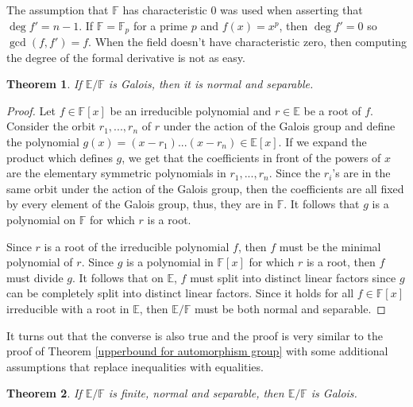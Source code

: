 \documentclass{article}
\theoremstyle{plain}
\newtheorem{theorem}{Theorem}[subsection]
\theoremstyle{definition}
\newcommand{\F}{\mathbb{F}}
\newcommand{\E}{\mathbb{E}}
\begin{document}
The assumption that $\F$ has characteristic 0 was used when asserting that $\deg f' = n-1$. If $\F = \F_p$ for a prime $p$ and $f(x) = x^p$, then $\deg f' = 0$ so $\gcd(f, f') = f$. When the field doesn't have characteristic zero, then computing the degree of the formal derivative is not as easy.

\begin{theorem}
\label{Galois implies normal and separable}
    If $\E / \F$ is Galois, then it is normal and separable.
\end{theorem}

\begin{proof}
    Let $f \in \F[x]$ be an irreducible polynomial and $r \in \E$ be a root of $f$. Consider the orbit $r_1, ..., r_n$ of $r$ under the action of the Galois group and define the polynomial $g(x) = (x-r_1)...(x-r_n) \in \E[x]$. If we expand the product which defines $g$, we get that the coefficients in front of the powers of $x$ are the elementary symmetric polynomials in $r_1, ..., r_n$. Since the $r_i$'s are in the same orbit under the action of the Galois group, then the coefficients are all fixed by every element of the Galois group, thus, they are in $\F$. It follows that $g$ is a polynomial on $\F$ for which $r$ is a root. 
    
    Since $r$ is a root of the irreducible polynomial $f$, then $f$ must be the minimal polynomial of $r$. Since $g$ is a polynomial in $\F[x]$ for which $r$ is a root, then $f$ must divide $g$. It follows that on $\E$, $f$ must split into distinct linear factors since $g$ can be completely split into distinct linear factors. Since it holds for all $f \in \F[x]$ irreducible with a root in $\E$, then $\E / \F$ must be both normal and separable.
\end{proof}

It turns out that the converse is also true and the proof is very similar to the proof of Theorem \ref{upperbound for automorphism group} with some additional assumptions that replace inequalities with equalities.

\begin{theorem}
\label{normal separable implies Galois}
    If $\E / \F$ is finite, normal and separable, then $\E / \F$ is Galois.
\end{theorem}
\end{document}
